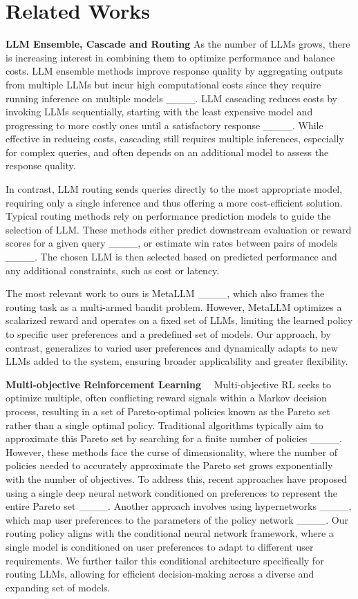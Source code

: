 \section{Related Works}
\textbf{LLM Ensemble, Cascade and Routing}\quad
As the number of LLMs grows, there is increasing interest in combining them to optimize performance and balance costs. LLM ensemble methods improve response quality by aggregating outputs from multiple LLMs but incur high computational costs since they require running inference on multiple models ____. LLM cascading reduces costs by invoking LLMs sequentially, starting with the least expensive model and progressing to more costly ones until a satisfactory response ____. While effective in reducing costs, cascading still requires multiple inferences, especially for complex queries, and often depends on an additional model to assess the response quality. 

In contrast, LLM routing sends queries directly to the most appropriate model, requiring only a single inference and thus offering a more cost-efficient solution. Typical routing methods rely on performance prediction models to guide the selection of LLM. These methods either predict downstream evaluation or reward scores for a given query ____, or estimate win rates between pairs of models ____. The chosen LLM is then selected based on predicted performance and any additional constraints, such as cost or latency. 

The most relevant work to ours is MetaLLM ____, which also frames the routing task as a multi-armed bandit problem. However, MetaLLM optimizes a scalarized reward and operates on a fixed set of LLMs, limiting the learned policy to specific user preferences and a predefined set of models. Our approach, by contrast, generalizes to varied user preferences and dynamically adapts to new LLMs added to the system, ensuring broader applicability and greater flexibility.

\textbf{Multi-objective Reinforcement Learning}~~
Multi-objective RL seeks to optimize multiple, often conflicting reward signals within a Markov decision process, resulting in a set of Pareto-optimal policies known as the Pareto set rather than a single optimal policy. Traditional algorithms typically aim to approximate this Pareto set by searching for a finite number of policies ____. However, these methods face the curse of dimensionality, where the number of policies needed to accurately approximate the Pareto set grows exponentially with the number of objectives. To address this, recent approaches have proposed using a single deep neural network conditioned on preferences to represent the entire Pareto set ____. Another approach involves using hypernetworks ____, which map user preferences to the parameters of the policy network ____. Our routing policy aligns with the conditional neural network framework, where a single model is conditioned on user preferences to adapt to different user requirements. We further tailor this conditional architecture specifically for routing LLMs, allowing for efficient decision-making across a diverse and expanding set of models.

